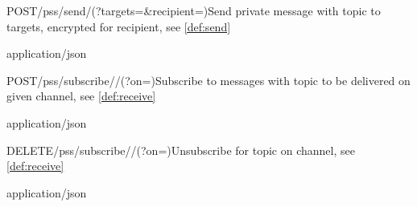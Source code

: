 
\begin{apiRoute}{POST}{/pss/send/(?targets=\&recipient=)}{Send private message with topic to targets, encrypted for recipient, see \ref{def:send}}
{
}
{ }

\begin{routeParameter} 
\end{routeParameter}
\begin{queryParameter} 
\end{queryParameter} 
\begin{headerParameter} 
\end{headerParameter}
\begin{routeResponse}{application/json}
\end{routeResponse}
\end{apiRoute}




\begin{apiRoute}{POST}{/pss/subscribe//(?on=)}{Subscribe to messages with topic to be delivered on given channel, see \ref{def:receive}}
{
}
{ }

\begin{routeParameter} 
\end{routeParameter}
\begin{queryParameter} 
\end{queryParameter} \begin{routeResponse}{application/json}
\end{routeResponse}
\end{apiRoute}

 
\begin{apiRoute}{DELETE}{/pss/subscribe//(?on=)}{Unsubscribe for topic on channel, see \ref{def:receive}}
{
}
{ }

\begin{routeParameter} 
\end{routeParameter}
\begin{queryParameter} 
\end{queryParameter} \begin{headerParameter} 
\end{headerParameter}
\begin{routeResponse}{application/json}
\end{routeResponse}
\end{apiRoute}